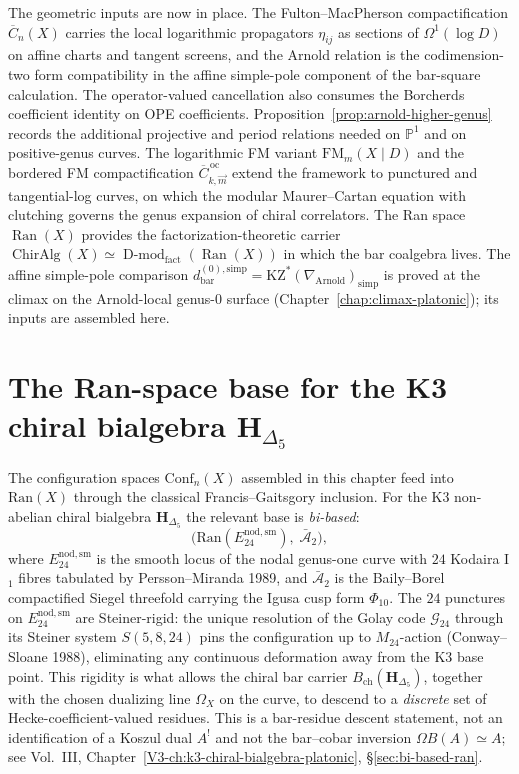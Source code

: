 \medskip\noindent
The geometric inputs are now in place. The Fulton--MacPherson compactification $\overline{C}_n(X)$ carries the local logarithmic propagators $\eta_{ij}$ as sections of $\Omega^1(\log D)$ on affine charts and tangent screens, and the Arnold relation is the codimension-two form compatibility in the affine simple-pole component of the bar-square calculation. The operator-valued cancellation also consumes the Borcherds coefficient identity on OPE coefficients. Proposition~\ref{prop:arnold-higher-genus} records the additional projective and period relations needed on $\mathbb{P}^1$ and on positive-genus curves. The logarithmic FM variant $\mathrm{FM}_m(X\mathbin{|}D)$ and the bordered FM compactification $\overline{C}^{\,\mathrm{oc}}_{k,\vec{m}}$ extend the framework to punctured and tangential-log curves, on which the modular Maurer--Cartan equation with clutching governs the genus expansion of chiral correlators. The Ran space $\operatorname{Ran}(X)$ provides the factorization-theoretic carrier $\operatorname{ChirAlg}(X) \simeq \operatorname{D-mod}_{\mathrm{fact}}(\operatorname{Ran}(X))$ in which the bar coalgebra lives. The affine simple-pole comparison
$d_{\mathrm{bar}}^{(0),\mathrm{simp}}=\mathrm{KZ}^{*}(\nabla_{\mathrm{Arnold}})_{\mathrm{simp}}$
is proved at the climax on the Arnold-local genus-$0$ surface (Chapter~\ref{chap:climax-platonic}); its inputs are assembled here.

\section{The Ran-space base for the K3 chiral bialgebra
$\mathbf H_{\Delta_5}$}
\label{sec:confspaces-supplement}

\begin{remark}
\label{rem:confspaces-1}
The configuration spaces $\mathrm{Conf}_n(X)$ assembled in this chapter
feed into $\mathrm{Ran}(X)$ through the classical Francis--Gaitsgory
inclusion. For the K3 non-abelian chiral bialgebra $\mathbf H_{\Delta_5}$
the relevant base is \emph{bi-based}:
\[
\bigl(\mathrm{Ran}(E^{\mathrm{nod,sm}}_{24}),\;\bar{\mathcal A}_2\bigr),
\]
where $E^{\mathrm{nod,sm}}_{24}$ is the smooth locus of the nodal genus-one
curve with $24$ Kodaira I$_1$ fibres tabulated by Persson--Miranda 1989,
and $\bar{\mathcal A}_2$ is the Baily--Borel compactified Siegel threefold
carrying the Igusa cusp form $\Phi_{10}$. The $24$ punctures on
$E^{\mathrm{nod,sm}}_{24}$ are Steiner-rigid: the unique resolution of
the Golay code $\mathcal G_{24}$ through its Steiner system $S(5,8,24)$
pins the configuration up to $M_{24}$-action (Conway--Sloane 1988),
eliminating any continuous deformation away from the K3 base point.
This rigidity is what allows the chiral bar carrier
$B_{\mathrm{ch}}(\mathbf H_{\Delta_5})$, together with the chosen
dualizing line $\Omega_X$ on the curve, to descend to a
\emph{discrete} set of Hecke-coefficient-valued residues. This is a
bar-residue descent statement, not an identification of a Koszul dual
$A^!$ and not the bar--cobar inversion $\Omega B(A)\simeq A$; see
Vol.~III,
Chapter~\ref{V3-ch:k3-chiral-bialgebra-platonic}, \S\ref{sec:bi-based-ran}.
\end{remark}

